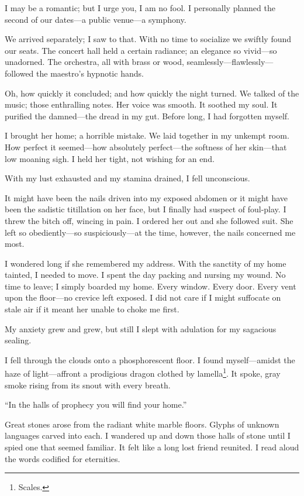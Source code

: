 \documentclass{article}
\begin{document}
\noindent
I may be a romantic; but I urge you, I am no fool.
I personally planned the second of our dates---a public venue---a symphony.


We arrived separately; I saw to that.
With no time to socialize we swiftly found our seats.
The concert hall held a certain radiance; an elegance
so vivid---so unadorned.
The orchestra, all with brass or wood, seamlessly---flawlessly---followed
the maestro's hypnotic hands.


Oh, how quickly it concluded; and how quickly the night turned.
We talked of the music; those enthralling notes.
Her voice was smooth. It soothed my soul.
It purified the damned---the dread in my gut.
Before long, I had forgotten myself.


I brought her home; a horrible mistake.
We laid together in my unkempt room.
How perfect it seemed---how
absolutely perfect---the
softness of her skin---that
low moaning sigh.
I held her tight, not wishing for an end.
\VV


\noindent
With my lust exhausted and my stamina drained, I fell unconscious.
\VV


\noindent
It might have been the nails driven into my exposed abdomen
or it might have been the sadistic titillation on her face,
but I finally had suspect of foul-play.
I threw the bitch off, wincing in pain.
I ordered her out and she followed suit.
She left so obediently---so suspiciously---at
the time, however, the nails concerned me most.


I wondered long if she remembered my address.
With the sanctity of my home tainted, I needed to move.
I spent the day packing and nursing my wound.
No time to leave; I simply boarded my home. Every
window. Every door. Every vent upon the floor---no
crevice left exposed.
I did not care if I might suffocate on stale air if
it meant her unable to choke me first.


My anxiety grew and grew, but still I slept
with adulation for my sagacious sealing.
\vvvv


\noindent
I fell through the clouds onto a phosphorescent floor.
I found myself---amidst the haze of light---affront
a prodigious dragon clothed by lamella\footnote{Scales.}. %
It spoke, gray smoke rising from its snout with every breath.
\VV


``In the halls of prophecy you will find your home.''
\VV


\noindent
Great stones arose from the radiant white marble floors.
Glyphs of unknown languages carved into each.
I wandered up and down those halls of stone
until I spied one that seemed familiar.
It felt like a long lost friend
reunited.  I read aloud the words codified for eternities.
\VV
\end{document}

